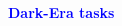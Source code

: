 \documentclass{beamer}
\renewenvironment{block}[1]{%
\begin{Sbox}%
\begin{minipage}[t]{\textwidth}
~\\
\textcolor{blue}{\quad #1}~\\
~\\%
\vspace{0.5cm}
} 
{%
\end{minipage}
\end{Sbox}\Ovalbox{\TheSbox}%
}
\begin{document}
{\begin{columns}[t]
\begin{column}{.49\linewidth}
\begin{block}{\large \textbf{Dark-Era tasks}}
\end{block}






\end{column}

\end{columns}
}
\end{document}
